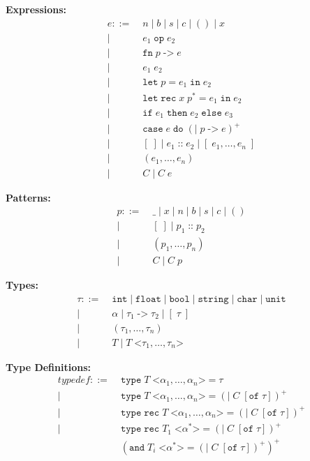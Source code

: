 \documentclass[conference,onecolumn]{IEEEtran}
\begin{document}
\textbf{Expressions:}
\begin{align*}
e ::= &\; n \mid b \mid s \mid c \mid () \mid x \\
    | &\; e_1 \; \texttt{op} \; e_2 \\
    | &\; \texttt{fn} \; p \; \texttt{->} \; e \\
    | &\; e_1 \; e_2 \\
    | &\; \texttt{let} \; p \; \texttt{=} \; e_1 \; \texttt{in} \; e_2 \\
    | &\; \texttt{let} \; \texttt{rec} \; x \; p^* \; \texttt{=} \; e_1 \; \texttt{in} \; e_2 \\
    | &\; \texttt{if} \; e_1 \; \texttt{then} \; e_2 \; \texttt{else} \; e_3 \\
    | &\; \texttt{case} \; e \; \texttt{do} \; (\texttt{|} \; p \; \texttt{->} \; e)^+ \\
    | &\; [ \; ] \mid e_1 \; \texttt{::} \; e_2 \mid [ \; e_1, \ldots, e_n \; ] \\
    | &\; ( e_1, \ldots, e_n ) \\
    | &\; C \mid C \; e
\end{align*}

\textbf{Patterns:}
\begin{align*}
p ::= &\; \_ \mid x \mid n \mid b \mid s \mid c \mid () \\
    | &\; [ \; ] \mid p_1 \; \texttt{::} \; p_2 \\
    | &\; ( p_1, \ldots, p_n ) \\
    | &\; C \mid C \; p
\end{align*}

\textbf{Types:}
\begin{align*}
\tau ::= &\; \texttt{int} \mid \texttt{float} \mid \texttt{bool} \mid \texttt{string} \mid \texttt{char} \mid \texttt{unit} \\
       | &\; \alpha \mid \tau_1 \; \texttt{->} \; \tau_2 \mid [ \; \tau \; ] \\
       | &\; ( \tau_1, \ldots, \tau_n ) \\
       | &\; T \mid T \; \texttt{<} \tau_1, \ldots, \tau_n \texttt{>}
\end{align*}

\textbf{Type Definitions:}
\begin{align*}
\textit{typedef} ::= &\; \texttt{type} \; T \; \texttt{<} \alpha_1, \ldots, \alpha_n \texttt{>} \; \texttt{=} \; \tau \\
                   | &\; \texttt{type} \; T \; \texttt{<} \alpha_1, \ldots, \alpha_n \texttt{>} \; \texttt{=} \; (\texttt{|} \; C \; [\texttt{of} \; \tau])^+ \\
                   | &\; \texttt{type} \; \texttt{rec} \; T \; \texttt{<} \alpha_1, \ldots, \alpha_n \texttt{>} \; \texttt{=} \; (\texttt{|} \; C \; [\texttt{of} \; \tau])^+ \\
                   | &\; \texttt{type} \; \texttt{rec} \; T_1 \; \texttt{<} \alpha^* \texttt{>} \; \texttt{=} \; (\texttt{|} \; C \; [\texttt{of} \; \tau])^+ \\
                   & \; (\texttt{and} \; T_i \; \texttt{<} \alpha^* \texttt{>} \; \texttt{=} \; (\texttt{|} \; C \; [\texttt{of} \; \tau])^+)^+
\end{align*}
\end{document}
